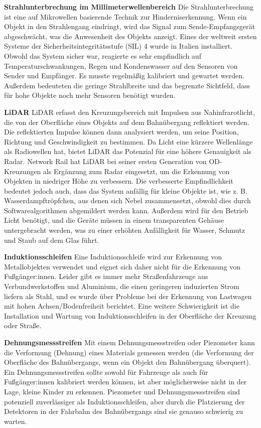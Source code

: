 \documentclass[
]{book}
\begin{document}
\textbf{Strahlunterbrechung im Millimeterwellenbereich}
Die Strahlunterbrechung ist eine auf Mikrowellen basierende Technik zur Hinderniserkennung. Wenn ein Objekt in den Strahlengang eindringt, wird das Signal zum Sende-Empfangsgerät abgeschwächt, was die Anwesenheit des Objekts anzeigt. Eines der weltweit ersten Systeme der Sicherheitsintegritätsstufe (SIL) 4 wurde in Italien installiert. Obwohl das System sicher war, reagierte es sehr empfindlich auf Temperaturschwankungen, Regen und Kondenswasser auf den Sensoren von Sender und Empfänger. Es musste regelmäßig kalibriert und gewartet werden. Außerdem bedeuteten die geringe Strahlbreite und das begrenzte Sichtfeld, dass für hohe Objekte noch mehr Sensoren benötigt wurden.

\textbf{LiDAR}
LiDAR erfasst den Kreuzungsbereich mit Impulsen aus Nahinfrarotlicht, die von der Oberfläche eines Objekts auf dem Bahnübergang reflektiert werden. Die reflektierten Impulse können dann analysiert werden, um seine Position, Richtung und Geschwindigkeit zu bestimmen. Da Licht eine kürzere Wellenlänge als Radiowellen hat, bietet LiDAR das Potenzial für eine höhere Genauigkeit als Radar. Network Rail hat LiDAR bei seiner ersten Generation von OD-Kreuzungen als Ergänzung zum Radar eingesetzt, um die Erkennung von Objekten in niedriger Höhe zu verbessern. Die verbesserte Empfindlichkeit bedeutet jedoch auch, dass das System anfällig für kleine Objekte ist, wie z. B. Wasserdampftröpfchen, aus denen sich Nebel zusammensetzt, obwohl dies durch Softwarealgorithmen abgemildert werden kann. Außerdem wird für den Betrieb Licht benötigt, und die Geräte müssen in einem transparenten Gehäuse untergebracht werden, was zu einer erhöhten Anfälligkeit für Wasser, Schmutz und Staub auf dem Glas führt.

\textbf{Induktionsschleifen}
Eine Induktionsschleife wird zur Erkennung von Metallobjekten verwendet und eignet sich daher nicht für die Erkennung von Fußgänger:innen. Leider gibt es immer mehr Straßenfahrzeuge aus Verbundwerkstoffen und Aluminium, die einen geringeren induzierten Strom liefern als Stahl, und es wurde über Probleme bei der Erkennung von Lastwagen mit hohen Achsen/Bodenfreiheit berichtet. Eine weitere Schwierigkeit ist die Installation und Wartung von Induktionsschleifen in der Oberfläche der Kreuzung oder Straße.

\textbf{Dehnungsmessstreifen}
Mit einem Dehnungsmessstreifen oder Piezometer kann die Verformung (Dehnung) eines Materials gemessen werden (die Verformung der Oberfläche des Bahnübergangs, wenn ein Objekt den Bahnübergang überquert). Ein Dehnungsmessstreifen sollte sowohl für Fahrzeuge als auch für Fußgänger:innen kalibriert werden können, ist aber möglicherweise nicht in der Lage, kleine Kinder zu erkennen. Piezometer und Dehnungsmessstreifen sind potenziell zuverlässiger als Induktionsschleifen, aber durch die Platzierung der Detektoren in der Fahrbahn des Bahnübergangs sind sie genauso schwierig zu warten.
\end{document}
